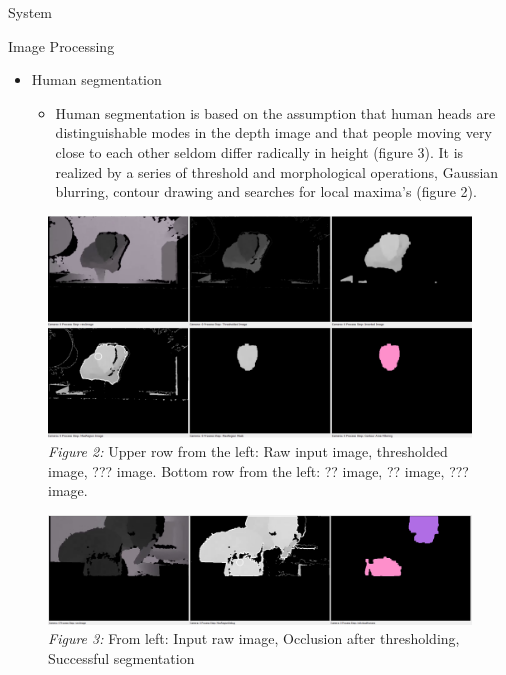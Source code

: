 \documentclass[final,hyperref={pdfpagelabels=false}]{beamer}
\begin{document}
\begin{frame}[t]
\begin{columns}[t]
\begin{column}{.465\textwidth}
\begin{block}{System}
\end{block}


\begin{block}{Image Processing}
\begin{itemize}
	\item Human segmentation
	\begin{itemize}
	\item Human segmentation is based on the assumption that human heads are distinguishable modes in the depth image and that people moving very close to each other seldom differ radically in height (figure 3). It is realized by a series of threshold and morphological operations, Gaussian blurring, contour drawing and searches for local maxima's (figure 2).
	\end{itemize}
\end{itemize}
\begin{figure}
	\includegraphics[width=0.9\linewidth]{humanSegmentationSteps.png}
	\caption{\centering \textit{Figure 2:} Upper row from the left: Raw input image, thresholded image, ??? image. \newline 
			 			 Bottom row from the left: ?? image, ?? image, ??? image. }
\end{figure}
\begin{figure}
	\includegraphics[width=0.9\linewidth]{KinectSegmentationIllustration_occlusionHandling_horizontal.png}
	\caption{\textit{Figure 3:} From left: Input raw image, Occlusion after thresholding, Successful segmentation}
\end{figure}


\end{block}
\end{column}
\end{columns}
\end{frame}
\end{document}
